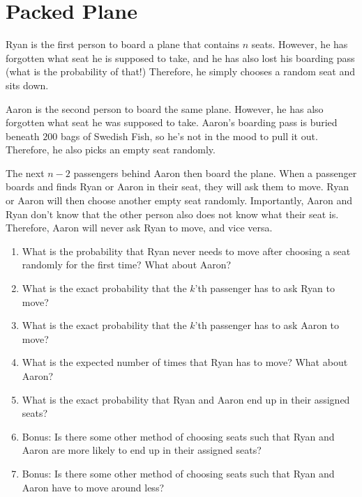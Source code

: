 \documentclass{article}
\begin{document}
\newpage

\section{Packed Plane}

Ryan is the first person to board a plane that contains $n$ seats. However, he has forgotten what seat he is supposed to take, and he has also lost his boarding pass (what is the probability of that!) Therefore, he simply chooses a random seat and sits down.

Aaron is the second person to board the same plane. However, he has also forgotten what seat he was supposed to take. Aaron's boarding pass is buried beneath $200$ bags of Swedish Fish, so he's not in the mood to pull it out. Therefore, he also picks an empty seat randomly.

The next $n - 2$ passengers behind Aaron then board the plane. When a passenger boards and finds Ryan or Aaron in their seat, they will ask them to move. Ryan or Aaron will then choose another empty seat randomly. Importantly, Aaron and Ryan don't know that the other person also does not know what their seat is. Therefore, Aaron will never ask Ryan to move, and vice versa.

\begin{enumerate}[label=(\alph*)]
\itemsep0em 
    \item What is the probability that Ryan never needs to move after choosing a seat randomly for the first time? What about Aaron?\vfill
    \item What is the exact probability that the $k$'th passenger has to ask Ryan to move?\vfill
    \item What is the exact probability that the $k$'th passenger has to ask Aaron to move?\vfill
    \item What is the expected number of times that Ryan has to move? What about Aaron?\vfill
    \item What is the exact probability that Ryan and Aaron end up in their assigned seats?\vfill
    \item Bonus: Is there some other method of choosing seats such that Ryan and Aaron are more likely to end up in their assigned seats?\vfill
    \item Bonus: Is there some other method of choosing seats such that Ryan and Aaron have to move around less?\vfill
\end{enumerate}

\newpage
\end{document}
